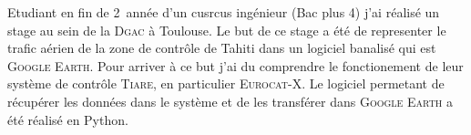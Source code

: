 Etudiant en fin de 2\ieme\ année d'un cusrcus ingénieur (Bac plus 4) j'ai réalisé un stage au sein de la \textsc{Dgac} à Toulouse. Le but de ce stage a été de representer le trafic aérien de la zone de contrôle de Tahiti dans un logiciel banalisé qui est \textsc{Google Earth}. Pour arriver à ce but j'ai du comprendre le fonctionement de leur système de contrôle \textsc{Tiare}, en particulier \textsc{Eurocat-X}. Le logiciel permetant de récupérer les données dans le système et de les transférer dans \textsc{Google Earth} a été réalisé en Python.
